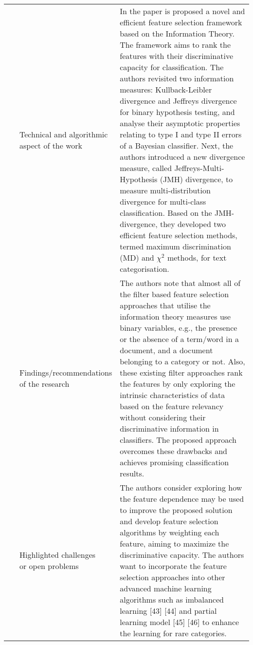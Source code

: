 \begin{landscape}
\begin{longtable}{lp{}p{}}
	\multirow{3}[0]{*}{~\citep{Tang2016a}} & 
    \specialcell{Technical and algorithmic \\ aspect of the work} &
    In the paper is proposed a novel and efficient feature selection framework based on the Information Theory. The framework aims to rank the features with their discriminative capacity for classification. The authors revisited two information measures: Kullback-Leibler divergence and Jeffreys divergence for binary hypothesis testing, and analyse their asymptotic properties relating to type I and type II errors of a Bayesian classifier. Next, the authors introduced a new divergence measure, called Jeffreys-Multi-Hypothesis (JMH) divergence, to measure multi-distribution divergence for multi-class classification. Based on the JMH-divergence, they developed two efficient feature selection methods, termed maximum discrimination (MD) and $\chi^2$ methods, for text categorisation. 
    \\ & 
    \specialcell{Findings/recommendations \\ of the research} & 
    The authors note that almost all of the filter based feature selection approaches that utilise the information theory measures use binary variables, e.g., the presence or the absence of a term/word in a document, and a document belonging to a category or not. Also, these existing filter approaches rank the features by only exploring the intrinsic characteristics of data based on the feature relevancy without considering their discriminative information in classifiers. The proposed approach overcomes these drawbacks and achieves promising classification results.
    \\ & 
    \specialcell{Highlighted challenges \\ or open problems} & 
    The authors consider exploring how the feature dependence may be used to improve the proposed solution and develop feature selection algorithms by weighting each feature, aiming to maximize the discriminative capacity. The authors want to incorporate the feature selection approaches into other advanced machine learning algorithms such as imbalanced learning [43] [44] and partial learning model [45] [46] to enhance the learning for rare categories.
	\\
	

\end{longtable}
\end{landscape}
